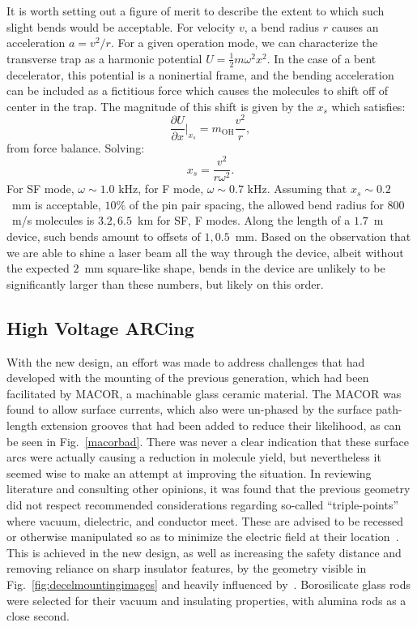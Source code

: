 It is worth setting out a figure of merit to describe the extent to which such slight bends would be acceptable. 
For velocity $v$, a bend radius $r$ causes an acceleration $a=v^2/r$. 
For a given operation mode, we can characterize the transverse trap as a harmonic potential $U=\frac{1}{2}m\omega^2x^2$. 
In the case of a bent decelerator, this potential is a noninertial frame, and the bending acceleration can be included as a fictitious force which causes the molecules to shift off of center in the trap.
The magnitude of this shift is given by the $x_s$ which satisfies:
\begin{equation}
\frac{\partial U}{\partial x}\biggr|_{x_s} = m_\text{OH}\frac{v^2}{r},
\end{equation}
from force balance. Solving:
\begin{equation}
x_s = \frac{v^2}{r\omega^2}.
\end{equation}
For SF mode, $\omega\sim1.0\text{ kHz}$, for F mode, $\omega\sim0.7\text{ kHz}$. Assuming that $x_s\sim0.2$~mm is acceptable, $10\%$ of the pin pair spacing, the allowed bend radius for $800$~m/s molecules is $3.2, 6.5$~km for SF, F modes.
Along the length of a $1.7$~m device, such bends amount to offsets of $1, 0.5$~mm.
Based on the observation that we are able to shine a laser beam all the way through the device, albeit without the expected $2$~mm square-like shape, bends in the device are unlikely to be significantly larger than these numbers, but likely on this order.

\subsection{High Voltage ARCing}

With the new design, an effort was made to address challenges that had developed with the mounting of the previous generation, which had been facilitated by MACOR, a machinable glass ceramic material.
The MACOR was found to allow surface currents, which also were un-phased by the surface path-length extension grooves that had been added to reduce their likelihood, as can be seen in Fig.~\ref{macorbad}.
There was never a clear indication that these surface arcs were actually causing a reduction in molecule yield, but nevertheless it seemed wise to make an attempt at improving the situation.
In reviewing literature and consulting other opinions, it was found that the previous geometry did not respect recommended considerations regarding so-called ``triple-points'' where vacuum, dielectric, and conductor meet. 
These are advised to be recessed or otherwise manipulated so as to minimize the electric field at their location~\cite{Miller1989}.
This is achieved in the new design, as well as increasing the safety distance and removing reliance on sharp insulator features, by the geometry visible in Fig.~\ref{fig:decelmountingimages} and heavily influenced by~\citep[Fig.~4]{VanDeMeerakker2006}.
Borosilicate glass rods were selected for their vacuum and insulating properties, with alumina rods as a close second.


